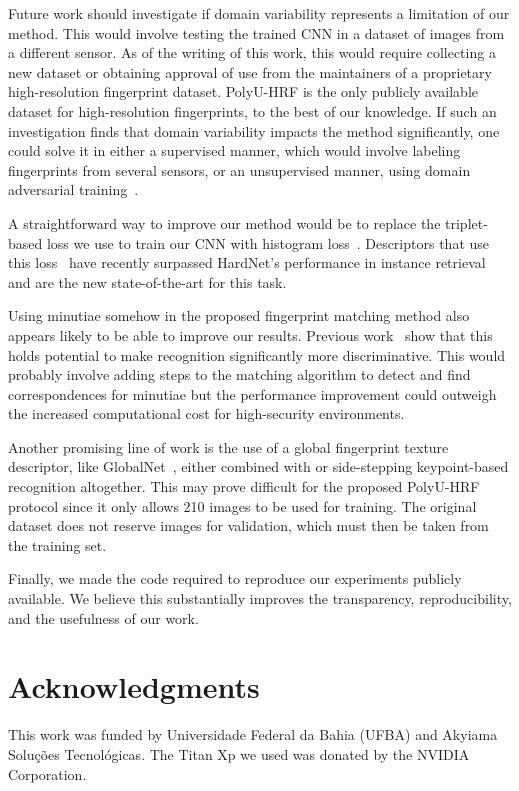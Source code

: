 \documentclass[10pt,twocolumn,letterpaper]{article}
\begin{document}
Future work should investigate if domain variability represents a limitation of our method.
This would involve testing the trained CNN in a dataset of images from a different sensor.
As of the writing of this work, this would require collecting a new dataset or obtaining approval of use from the maintainers of a proprietary high-resolution fingerprint dataset.
PolyU-HRF is the only publicly available dataset for high-resolution fingerprints, to the best of our knowledge.
If such an investigation finds that domain variability impacts the method significantly, one could solve it in either a supervised manner, which would involve labeling fingerprints from several sensors, or an unsupervised manner, \eg using domain adversarial training~\cite{domain-gan}.

A straightforward way to improve our method would be to replace the triplet-based loss we use to train our CNN with histogram loss~\cite{histogram-loss}.
Descriptors that use this loss~\cite{doap} have recently surpassed HardNet's performance in instance retrieval and are the new state-of-the-art for this task.

Using minutiae somehow in the proposed fingerprint matching method also appears likely to be able to improve our results.
Previous work~\cite{feature-guided, td-sparse} show that this holds potential to make recognition significantly more discriminative.
This would probably involve adding steps to the matching algorithm to detect and find correspondences for minutiae but the performance improvement could outweigh the increased computational cost for high-security environments.

Another promising line of work is the use of a global fingerprint texture descriptor, like GlobalNet~\cite{zhang-pattern-rec}, either combined with or side-stepping keypoint-based recognition altogether.
This may prove difficult for the proposed PolyU-HRF protocol since it only allows 210 images to be used for training.
The original dataset does not reserve images for validation, which must then be taken from the training set.

Finally, we made the code required to reproduce our experiments publicly available.
We believe this substantially improves the transparency, reproducibility, and the usefulness of our work.

\ifcvprfinal
\section*{Acknowledgments}
This work was funded by Universidade Federal da Bahia (UFBA) and Akyiama Solu\c c\~oes Tecnol\'ogicas.
The Titan Xp we used was donated by the NVIDIA Corporation.
\fi{\small


}
\end{document}
